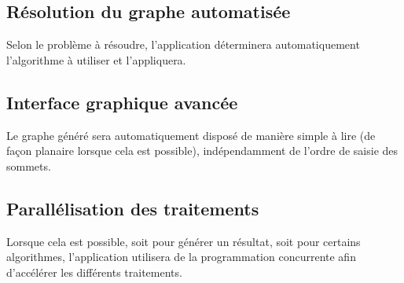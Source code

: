 \documentclass[french]{article}
\begin{document}
		\subsection{Résolution du graphe automatisée}
			Selon le problème à résoudre, l'application déterminera automatiquement l'algorithme à utiliser et l'appliquera.
		
		\subsection{Interface graphique avancée}
			Le graphe généré sera automatiquement disposé de manière simple à lire (de façon planaire lorsque cela est possible), indépendamment de l'ordre de saisie des sommets. 
		
		\subsection{Parallélisation des traitements}
			Lorsque cela est possible, soit pour générer un résultat, soit pour certains algorithmes, l'application utilisera de la programmation concurrente afin d'accélérer les différents traitements.
			
\end{document}
